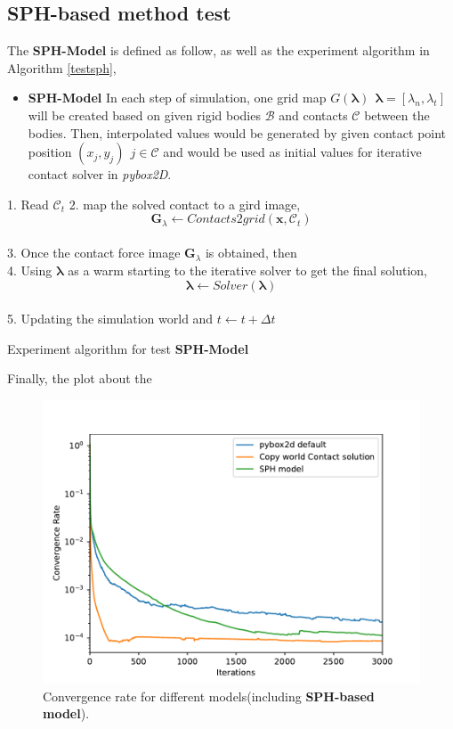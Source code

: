 \subsection{SPH-based method test}
    \label{sphtest}
    The \textbf{SPH-Model} is defined as follow, as well as the experiment algorithm in Algorithm \ref{testsph},
    \begin{itemize}
         \item \textbf{SPH-Model} In each step of simulation, one grid map $G(\mathbf{\pmb{\lambda}})~~\pmb{\lambda} = [\lambda_n, \lambda_t]$ will be created based on given rigid bodies $\mathcal{B}$ and contacts $\mathcal{C}$ between the bodies. Then, interpolated values would be generated by given contact point position $(x_j, y_j)~~j \in \mathcal{C}$ and would be used as initial values for iterative contact solver in \textit{pybox2D}. 
    \end{itemize}
    \begin{algorithm}[!h]
        {
            1. Read $\mathcal{C}_t$
            2. map the solved contact to a gird image, 
                $$\pmb{G}_{\lambda} \gets Contacts2grid(\mathbf{x}, \mathcal{C}_t)$$ \\
            3. Once the contact force image $\pmb{G}_{\lambda}$ is obtained,  then \\
            4. Using $\pmb{\lambda}$ as a warm starting to the iterative solver to get the final solution,
            $$\pmb{\lambda} \gets Solver(\pmb{\lambda})$$ \\
            5. Updating the simulation world and $t \gets t+\Delta t$
        }
        \caption{Experiment algorithm for test \textbf{SPH-Model}}
        \label{testsph}
    \end{algorithm}
    Finally, the plot about the 
    \begin{figure}[!h]
        \centering
        \includegraphics[width=\textwidth]{Figures/addsph}
        \caption{Convergence rate for different models(including \textbf{SPH-based model}).}
        \label{fg:addsph}
    \end{figure}
